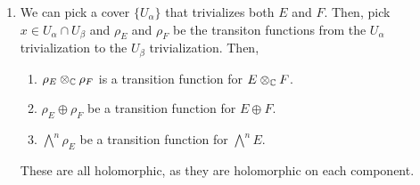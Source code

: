 \documentclass[12pt]{article}
\begin{document}
\begin{solution}
\begin{enumerate}
        \item We can pick a cover $\{U_\alpha\}$ that trivializes both $E$ and $F$. Then, pick $x \in U_\alpha \cap U_\beta$ and $\rho_E$ and $\rho_F$ be the transiton functions from the $U_\alpha$ trivialization to the $U_\beta$ trivialization. Then, 
        \begin{enumerate}
            \item $\rho_E \otimes_\mathbb C \rho_F$ is a transition function for $E \otimes_\mathbb C F$. 
            \item $\rho_E \oplus \rho_F$ be a transition function for $E \oplus F$.
            \item $\bigwedge^n \rho_E$ be a transition function for $\bigwedge^n E$.
        \end{enumerate}
        These are all holomorphic, as they are holomorphic on each component. 
        
    \end{enumerate}
\end{solution}


\end{document}
